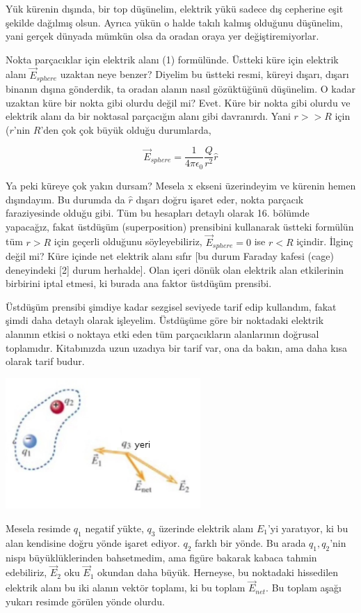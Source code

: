 \documentclass[12pt,fleqn]{article}\usepackage{../../common}
\begin{document}
Yük kürenin dışında, bir top düşünelim, elektrik yükü sadece dış cepherine eşit
şekilde dağılmış olsun. Ayrıca yükün o halde takılı kalmış olduğunu düşünelim,
yani gerçek dünyada mümkün olsa da oradan oraya yer değiştiremiyorlar. 

Nokta parçacıklar için elektrik alanı (1) formülünde. Üstteki küre için elektrik
alanı $\vec{E}_{sphere}$ uzaktan neye benzer? Diyelim bu üstteki resmi, küreyi
dışarı, dışarı binanın dışına gönderdik, ta oradan alanın nasıl gözüktüğünü
düşünelim. O kadar uzaktan küre bir nokta gibi olurdu değil mi? Evet. Küre bir
nokta gibi olurdu ve elektrik alanı da bir noktasal parçacığın alanı gibi
davranırdı. Yani $r >> R$ için ($r$'nin $R$'den çok çok büyük olduğu durumlarda,

$$ \vec{E}_{sphere} = \frac{1}{4\pi \epsilon_0} \frac{Q}{r^2} \hat{r} $$

Ya peki küreye çok yakın dursam? Mesela x ekseni üzerindeyim ve kürenin hemen
dışındayım. Bu durumda da $\hat{r}$ dışarı doğru işaret eder, nokta parçacık
faraziyesinde olduğu gibi.  Tüm bu hesapları detaylı olarak 16. bölümde
yapacağız, fakat üstdüşüm (superposition) prensibini kullanarak üstteki formülün
tüm $r > R$ için geçerli olduğunu söyleyebiliriz, $\vec{E}_{sphere} = 0$ ise
$r<R$ içindir. İlginç değil mi? Küre içinde net elektrik alanı sıfır [bu durum
  Faraday kafesi (cage) deneyindeki [2] durum herhalde]. Olan içeri dönük olan
elektrik alan etkilerinin birbirini iptal etmesi, ki burada ana faktor üstdüşüm
prensibi.

Üstdüşüm prensibi şimdiye kadar sezgisel seviyede tarif edip kullandım, fakat
şimdi daha detaylı olarak işleyelim. Üstdüşüme göre bir noktadaki elektrik
alanının etkisi o noktaya etki eden tüm parçacıkların alanlarının doğrusal
toplamıdır. Kitabınızda uzun uzadıya bir tarif var, ona da bakın, ama daha kısa
olarak tarif budur.

\includegraphics[width=20em]{02_07.png}

Mesela resimde $q_1$ negatif yükte, $q_3$ üzerinde elektrik alanı $E_1$'yi
yaratıyor, ki bu alan kendisine doğru yönde işaret ediyor. $q_2$ farklı bir
yönde. Bu arada $q_1,q_2$'nin nispı büyüklüklerinden bahsetmedim, ama figüre
bakarak kabaca tahmin edebiliriz, $\vec{E}_2$ oku $\vec{E}_1$ okundan daha
büyük. Herneyse, bu noktadaki hissedilen elektrik alanı bu iki alanın vektör
toplamı, ki bu toplam $\vec{E}_{net}$. Bu toplam aşağı yukarı resimde görülen
yönde olurdu. 
\end{document}

